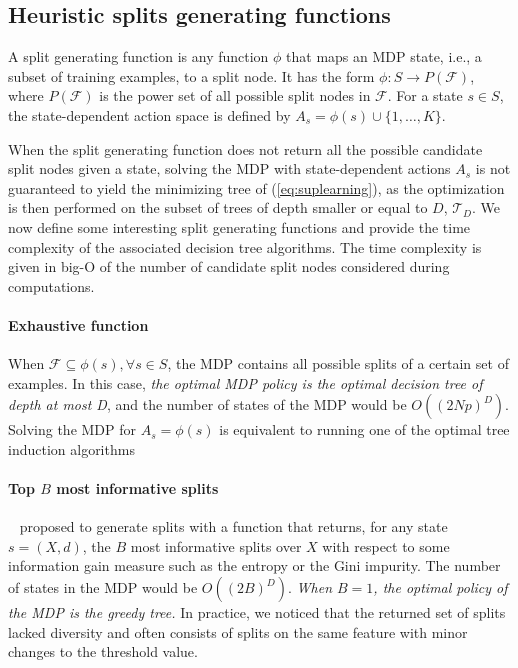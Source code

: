 \subsection{Heuristic splits generating functions}\label{sec:testgen}

A split generating function is any function $\phi$ that maps an MDP state, i.e., a subset of training examples, to a split node. It has the form $\phi: S \rightarrow P(\mathcal{F})$, where $P(\mathcal{F})$ is the power set of all possible split nodes in $\mathcal F$. 
For a state $s \in S$, the state-dependent action space is defined by $A_s = \phi(s) \cup  \{1,\ldots,K\}$. 

When the split generating function does not return all the possible candidate split nodes given a state, solving the MDP with state-dependent actions $A_s$ is not guaranteed to yield the minimizing tree of (\ref{eq:suplearning}), as the 
optimization is then performed on the subset of trees of depth smaller or equal to $D$, $\mathcal{T}_D$. 
We now define some interesting split generating functions and provide the time complexity of the associated decision tree algorithms. The time complexity is given in big-O of the number of candidate split nodes considered during computations. 

\paragraph{Exhaustive function} When $\mathcal{F} \subseteq \phi(s), \forall s \in S$, the MDP contains all possible splits of a certain set of examples. In this case, \textit{the optimal MDP policy is the optimal decision tree of depth at most D},
and the number of states of the MDP would be $O({(2Np)}^D)$. Solving the MDP for $A_s = \phi(s)$ is equivalent to running one of the optimal tree induction algorithms~\cite{verwer2017learning,oct,pystreed,quantbnb,binoct,murtree,mfoct,blossom,lin2020generalized,chaouki2024branchesfastdynamicprogramming}

\paragraph{Top $B$ most informative splits}\label{topk-heuristic}~\cite{topk} proposed to generate splits with a function that returns, for any state $s=(X,d)$, the $B$ most informative splits over $X$ with respect to some information gain measure such as the entropy or the Gini impurity. 
The number of states in the MDP would be $O({(2B)}^D)$. \textit{When $B=1$, the optimal policy of the MDP is the greedy tree.} 
In practice, we noticed that the returned set of splits lacked diversity and often consists of splits on the same feature with minor changes to the threshold value. 

